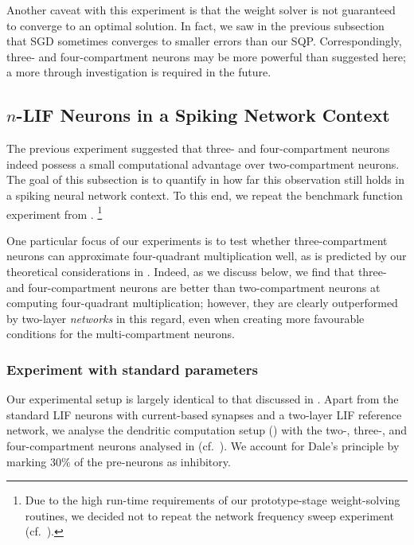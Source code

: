 Another caveat with this experiment is that the weight solver is not guaranteed to converge to an optimal solution.
In fact, we saw in the previous subsection that SGD sometimes converges to smaller errors than our SQP.
Correspondingly, three- and four-compartment neurons may be more powerful than suggested here; a more through investigation is required in the future.

\subsection{$n$-LIF Neurons in a Spiking Network Context}
\label{sec:nlif_experiment_3}

The previous experiment suggested that three- and four-compartment neurons indeed possess a small computational advantage over two-compartment neurons.
The goal of this subsection is to quantify in how far this observation still holds in a spiking neural network context.
To this end, we repeat the benchmark function experiment from .%
\footnote{
Due to the high run-time requirements of our prototype-stage weight-solving routines, we decided not to repeat the network frequency sweep experiment (cf.~).
}

One particular focus of our experiments is to test whether three-compartment neurons can approximate four-quadrant multiplication well, as is predicted by our theoretical considerations in .
Indeed, as we discuss below, we find that three- and four-compartment neurons are better than two-compartment neurons at computing four-quadrant multiplication; however, they are clearly outperformed by two-layer \emph{networks} in this regard, even when creating more favourable conditions for the multi-compartment neurons.

\subsubsection{Experiment with standard parameters}
Our experimental setup is largely identical to that discussed in .
Apart from the standard LIF neurons with current-based synapses and a two-layer LIF reference network, we analyse the dendritic computation setup () with the two-, three-, and four-compartment neurons analysed in  (cf.~).
We account for Dale's principle by marking $30\%$ of the pre-neurons as inhibitory.

